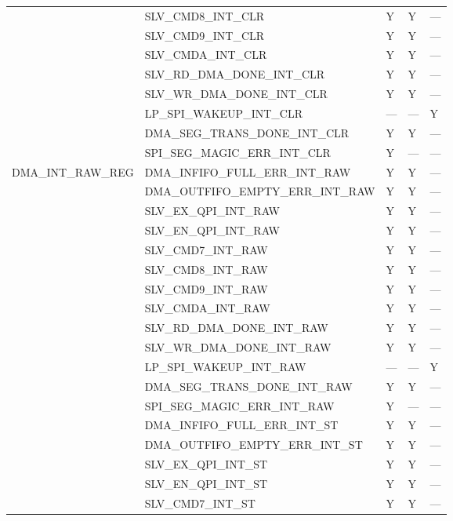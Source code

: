 \documentclass[main\_\_CN.tex]{subfiles}
\begin{document}
\begin{longtable}{|p{4.0cm}|p{6.0cm}|p{1.5cm}|p{1.5cm}|p{1.5cm}|}
& SLV\_CMD8\_INT\_CLR & Y & Y & --- \\ \cline{2-5}
& SLV\_CMD9\_INT\_CLR & Y & Y & --- \\ \cline{2-5}
& SLV\_CMDA\_INT\_CLR & Y & Y & --- \\ \cline{2-5}
& SLV\_RD\_DMA\_DONE\_INT\_CLR & Y & Y & --- \\ \cline{2-5}
& SLV\_WR\_DMA\_DONE\_INT\_CLR & Y & Y & --- \\ \cline{2-5}
& LP\_SPI\_WAKEUP\_INT\_CLR & --- & --- & Y \\ \cline{2-5}
& DMA\_SEG\_TRANS\_DONE\_INT\_CLR & Y & Y & --- \\ \cline{2-5}
& SPI\_SEG\_MAGIC\_ERR\_INT\_CLR & Y & --- & --- \\ \hline
\multirow{13}{*}{DMA\_INT\_RAW\_REG} & DMA\_INFIFO\_FULL\_ERR\_INT\_RAW & Y & Y & --- \\ \cline{2-5}
& DMA\_OUTFIFO\_EMPTY\_ERR\_INT\_RAW & Y & Y & --- \\ \cline{2-5}
& SLV\_EX\_QPI\_INT\_RAW & Y & Y & --- \\ \cline{2-5}
& SLV\_EN\_QPI\_INT\_RAW & Y & Y & --- \\ \cline{2-5}
& SLV\_CMD7\_INT\_RAW & Y & Y & --- \\ \cline{2-5}
& SLV\_CMD8\_INT\_RAW & Y & Y & --- \\ \cline{2-5}
& SLV\_CMD9\_INT\_RAW & Y & Y & --- \\ \cline{2-5}
& SLV\_CMDA\_INT\_RAW & Y & Y & --- \\ \cline{2-5}
& SLV\_RD\_DMA\_DONE\_INT\_RAW & Y & Y & --- \\ \cline{2-5}
& SLV\_WR\_DMA\_DONE\_INT\_RAW & Y & Y & --- \\ \cline{2-5}
& LP\_SPI\_WAKEUP\_INT\_RAW & --- & --- & Y \\ \cline{2-5}
& DMA\_SEG\_TRANS\_DONE\_INT\_RAW & Y & Y & --- \\ \cline{2-5}
& SPI\_SEG\_MAGIC\_ERR\_INT\_RAW & Y & --- & --- \\ \hline
\clearpage
\multirow{13}{*}{DMA\_INT\_ST\_REG} & DMA\_INFIFO\_FULL\_ERR\_INT\_ST & Y & Y & --- \\ \cline{2-5}
& DMA\_OUTFIFO\_EMPTY\_ERR\_INT\_ST & Y & Y & --- \\ \cline{2-5}
& SLV\_EX\_QPI\_INT\_ST & Y & Y & --- \\ \cline{2-5}
& SLV\_EN\_QPI\_INT\_ST & Y & Y & --- \\ \cline{2-5}
& SLV\_CMD7\_INT\_ST & Y & Y & --- \\ \cline{2-5}

\end{longtable}
\end{document}
